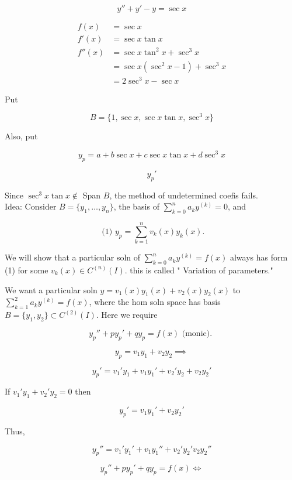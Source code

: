 \begin{example}
  \[ y'' + y' - y = \sec x \]

  \begin{align*}
    f(x) &= \sec x \\
    f'(x) &= \sec x \tan x \\
    f''(x) &= \sec x \tan^2x + \sec^3x \\
    &= \sec x (\sec^2x - 1) + \sec^3x \\
    &= 2\sec^3x - \sec x
  \end{align*}

  Put 

  \[ B = \{ 1, \sec x, \sec x \tan x, \sec^3x \}  \]

  Also, put 

  \[ y_p = a + b \sec x + c\sec x \tan x + d \sec^3x \]

  \[ y_p'  \]

  Since \( \sec^3x \tan x \notin  \) Span \( B \), the method of
  undetermined coefis fails. \\[5mm]

  Idea: Consider \( B = \{ y_1, \dots, y_n \} \), the basis of \(
  \sum_{k=0}^{n} a_k y^{(k)} = 0 \), and 

  \[ \text{ (1) } y_p = \sum_{k=1}^{n} v_k(x) y_k(x). \]

  We will show that a particular soln of \( \sum_{k=0}^{n} a_k y^{(k)}
  = f(x)  \) always has form (1) for some \( v_k(x) \in C^{(n)} (I) \).
  this is called " Variation of parameters."

\end{example}


We want a particular soln \( y = v_1(x) y_1(x) + v_2(x) y_2(x) \) to \(
\sum_{k=1}^{2} a_k y^{(k)} = f(x) \), where the hom soln space has basis
\( B = \{ y_1, y_2 \}  \subset C^{(2)}(I) \). Here we require 

\[  y_p'' + py_p' + qy_p = f(x) \text{ (monic). } \]

\[ y_p = v_1y_1 + v_2y_2 \implies \]

\[ y_p' = v_1'y_1 + v_1y_1' + v_2'y_2 + v_2y_2' \]

If \( v_1'y_1 + v_2'y_2 = 0 \) then 

\[ y_p' = v_1y_1' + v_2y_2' \]

Thus, 

\[ y_p'' = v_1'y_1' + v_1y_1'' + v_2'y_2' v_2y_2'' \]

\[ y_p'' +py_p' + qy_p = f(x) \iff \]

